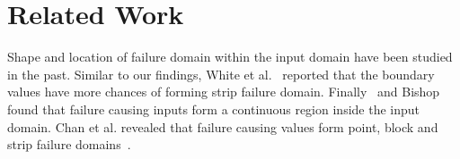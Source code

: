 \documentclass[runningheads,a4paper]{llncs}
\begin{document}













\section{Related Work}
Shape and location of failure domain within the input domain have been studied in the past. Similar to our findings, White et al.~\cite{white1980domain} reported that the boundary values have more chances of forming strip failure domain. Finally~\cite{finelli1991nasa} and Bishop~\cite{bishop1993variation} found that failure causing inputs form a continuous region inside the input domain. Chan et al. revealed that failure causing values form point, block and strip failure domains~\cite{chan1996proportional}. 
\end{document}
